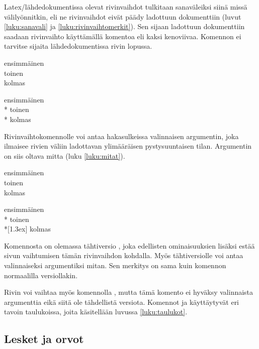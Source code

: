 Latex\-/lähdedokumentissa olevat rivinvaihdot tulkitaan sanaväleiksi
siinä missä välilyönnitkin, eli ne rivinvaihdot eivät päädy ladottuun
dokumenttiin (luvut \ref{luku:sanavali} ja
\ref{luku:rivinvaihtomerkit}). Sen sijaan ladottuun dokumenttiin saadaan
rivinvaihto käyttämällä komentoa \komentom{\keno} eli kaksi kenoviivaa.
Komennon ei tarvitse sijaita lähdedokumentissa rivin lopussa.

\komentoi{\keno}
\begin{koodilohkosis}
ensimmäinen \\ toinen \\
kolmas
\end{koodilohkosis}

\begin{tulossis}
  ensimmäinen \\* toinen \\* kolmas
\end{tulossis}

Rivinvaihtokomennolle voi antaa hakasulkeissa valinnaisen argumentin,
joka ilmaisee rivien väliin ladottavan ylimääräisen pystysuuntaisen
tilan. Argumentin on siis oltava mitta (luku \ref{luku:mitat}).

\komentoi{\keno}
\begin{koodilohkosis}
ensimmäinen \\ toinen \\[1.3ex] kolmas
\end{koodilohkosis}

\begin{tulossis}
  ensimmäinen \\* toinen \\*[1.3ex] kolmas
\end{tulossis}

Komennosta on olemassa tähtiversio \komentom{\keno *}, joka edellisten
ominaisuuksien lisäksi estää sivun vaihtumisen tämän rivinvaihdon
kohdalla. Myös tähtiversiolle voi antaa valinnaiseksi argumentiksi
mitan. Sen merkitys on sama kuin komennon normaalilla versiollakin.

Rivin voi vaihtaa myös komennolla , mutta tämä
komento ei hyväksy valinnaista argumenttia eikä siitä ole tähdellistä
versiota. Komennot  ja \komento{\keno} käyttäytyvät eri
tavoin taulukoissa, joita käsitellään luvussa \ref{luku:taulukot}.

\subsection{Lesket ja orvot}

